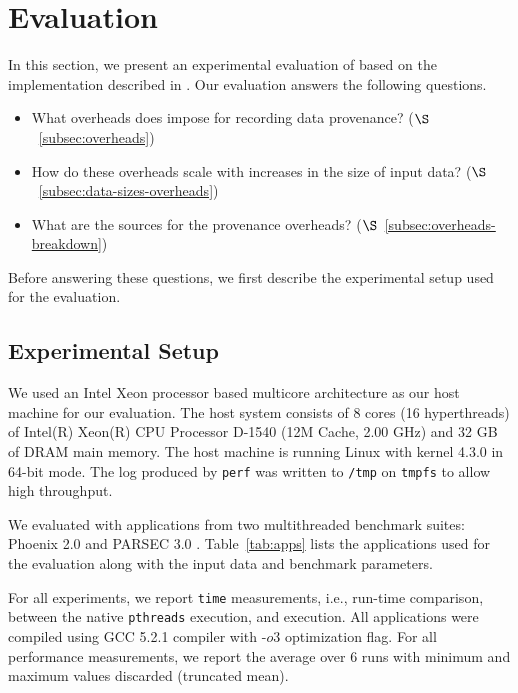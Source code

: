 \section{Evaluation}
\label{sec:evaluation}

In this section, we present an experimental evaluation of \projecttitle based on the implementation described in  . Our evaluation answers the following questions.

\begin{itemize}
\item What overheads does \projecttitle impose for recording data provenance? ($\S$~\ref{subsec:overheads})
\item How do these overheads scale with increases in the size of input data? ($\S$~\ref{subsec:data-sizes-overheads})
\item What are the sources for the provenance overheads? ($\S$~\ref{subsec:overheads-breakdown})
\end{itemize}

Before answering these questions, we first describe the experimental setup used for the evaluation.

\subsection{Experimental Setup}


 We used an Intel Xeon processor based
multicore architecture as our host machine for our evaluation. The
host system consists of 8 cores (16 hyperthreads) of Intel(R) Xeon(R) CPU Processor D-1540
(12M Cache, 2.00 GHz) and 32 GB of DRAM main memory. The host
machine is running Linux with kernel 4.3.0 in 64-bit mode. The log produced by
{\tt perf} was written to {\tt /tmp} on {\tt tmpfs} to allow high throughput.


  We evaluated \projecttitle with applications from two multithreaded benchmark suites: Phoenix 2.0 \cite{phoenix} and PARSEC 3.0 \cite{parsec}. Table~\ref{tab:apps} lists the applications used for the evaluation along with the input data and benchmark parameters.


  For all experiments,  we report {\tt time}
measurements, i.e., run-time comparison, between the native {\tt pthreads}
execution, and \projecttitle execution.  All applications were compiled using
GCC 5.2.1 compiler with -$o3$ optimization flag. For all performance
measurements, we report the average over 6 runs with minimum and maximum values
discarded (truncated mean).

